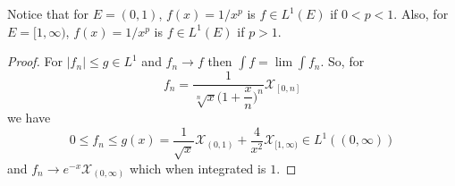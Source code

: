 \vspace{2ex}
\begin{rmk}
Notice that for $E=(0,1)$, $f(x)=1/x^{p}$ is $f\in L^{1}(E)$ if $0<p<1$. Also, for $E=[1,\infty )$, $f(x)=1/x^{p}$ is $f\in L^{1}(E)$ if $p>1$. 
\end{rmk}
\vspace{2ex}
\begin{proof}
For $|f_{n}|\leq g\in L^{1}$ and $f_{n}\rightarrow f$ then $\int f=\lim \int f_{n}$. So, for
\[f_{n}=\dfrac{1}{\sqrt[n]{x}\Big(1+\dfrac{x}{n}\Big)^{n}}\mathcal{X}_{[0,n]}\]
we have
\[0\leq f_{n}\leq g(x)=\dfrac{1}{\sqrt{x}}\mathcal{X}_{(0,1)}+\dfrac{4}{x^2}\mathcal{X}_{[1,\infty )}\in L^{1}((0,\infty ))\]
and $f_{n}\rightarrow e^{-x}\mathcal{X}_{(0,\infty )}$ which when integrated is $1$.  
\end{proof}
\vspace{2ex}


